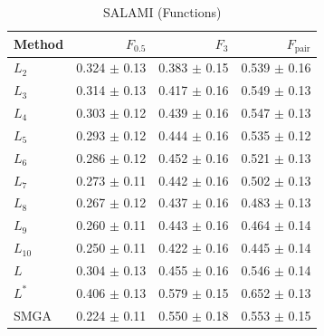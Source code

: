\documentclass{article}
\begin{document}
\begin{table}[t]
\centering
\caption{ SALAMI (Functions)\label{results:salami:func}}
\begin{tabular}{lrrr}
\toprule
Method & $F_{0.5}$ & $F_3$ & $F_\text{pair}$\\
\midrule
$L_2$   & 0.324 $\pm$ 0.13 & 0.383 $\pm$ 0.15   & 0.539 $\pm$ 0.16\\
$L_3$   & 0.314 $\pm$ 0.13 & 0.417 $\pm$ 0.16   & 0.549 $\pm$ 0.13\\
$L_4$   & 0.303 $\pm$ 0.12 & 0.439 $\pm$ 0.16   & 0.547 $\pm$ 0.13\\
$L_5$   & 0.293 $\pm$ 0.12 & 0.444 $\pm$ 0.16   & 0.535 $\pm$ 0.12\\
$L_6$   & 0.286 $\pm$ 0.12 & 0.452 $\pm$ 0.16   & 0.521 $\pm$ 0.13\\
$L_7$   & 0.273 $\pm$ 0.11 & 0.442 $\pm$ 0.16   & 0.502 $\pm$ 0.13\\
$L_8$   & 0.267 $\pm$ 0.12 & 0.437 $\pm$ 0.16   & 0.483 $\pm$ 0.13\\
$L_9$   & 0.260 $\pm$ 0.11 & 0.443 $\pm$ 0.16   & 0.464 $\pm$ 0.14\\
$L_{10}$& 0.250 $\pm$ 0.11 & 0.422 $\pm$ 0.16   & 0.445 $\pm$ 0.14\\
\midrule
$L$     & 0.304 $\pm$ 0.13 & 0.455 $\pm$ 0.16   & 0.546 $\pm$ 0.14\\
$L^*$   & 0.406 $\pm$ 0.13 & 0.579 $\pm$ 0.15   & 0.652 $\pm$ 0.13\\
\midrule
SMGA    & 0.224 $\pm$ 0.11 & 0.550 $\pm$ 0.18   & 0.553 $\pm$ 0.15\\
\bottomrule
\end{tabular}
\end{table}
\end{document}
